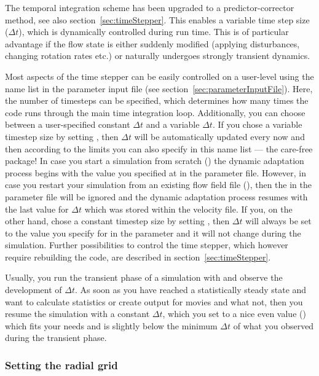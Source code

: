\documentclass[a4paper, 11pt, DIV=11]{scrartcl}
\begin{document}
The temporal integration scheme has been upgraded to a predictor-corrector method,
see also section~\ref{sec:timeStepper}. This enables a variable time step size
($\Delta t$), which is dynamically controlled during run time. This is of particular
advantage if the flow state is either suddenly modified (applying disturbances,
changing rotation rates etc.) or naturally undergoes strongly transient dynamics.
\par
Most aspects of the time stepper can be easily controlled on a user-level using the
name list  in the parameter input file (see
section~\ref{sec:parameterInputFile}). Here, the number of timesteps can be specified,
which determines how many times the code runs through the main time integration loop.
Additionally, you can choose between a user-specified constant $\Delta t$ and a
variable $\Delta t$. If you chose a variable timestep size by setting ,
then $\Delta t$ will be automatically updated every now and then according to the limits
you can also specify in this name list --- the care-free package! In case
you start a simulation from scratch () the dynamic adaptation
process begins with the value you specified at  in the parameter
file. However, in case you restart your simulation from an existing flow field
file (), then the  in the parameter file will
be ignored and the dynamic adaptation process resumes with the last value for
$\Delta t$ which was stored within the velocity file. If you, on the other hand,
chose a constant timestep size by setting , then $\Delta t$
will always be set to the value you specify for  in the parameter
and it will not change during the simulation. Further possibilities to control the
time stepper, which however require rebuilding the code, are described in
section~\ref{sec:timeStepper}.
\par
Usually, you run the transient phase of a simulation with 
and observe the development of $\Delta t$. As soon as you have reached a statistically
steady state and want to calculate statistics or create output for movies and what not,
then you resume the simulation with a constant $\Delta t$, which you set to a nice even
value () which fits your needs and is slightly below the minimum
$\Delta t$ of what you observed during the transient phase.

\subsubsection{Setting the radial grid}
\label{sec:radialGrid}
\end{document}
